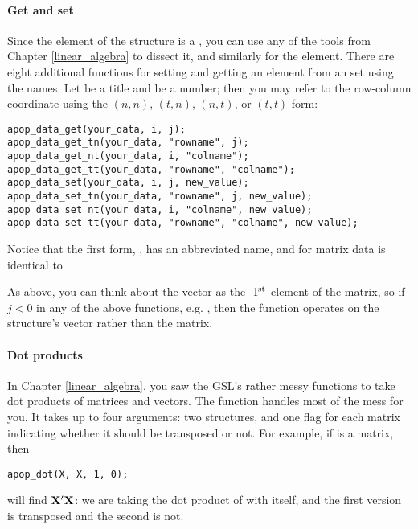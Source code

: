 \paragraph{Get and set} Since the  element of the  structure
is a , you can use any of the tools from Chapter
\ref{linear_algebra} to dissect it, and similarly for the
 element.
There are eight additional functions for setting and getting an element from an
 set using the names. Let  be a title and
 be a number; then you may refer to the row-column coordinate
using the $(n,n)$, $(t,n)$, $(n,t)$, or $(t,t)$ form:
\begin{lstlisting}
apop_data_get(your_data, i, j);
apop_data_get_tn(your_data, "rowname", j);
apop_data_get_nt(your_data, i, "colname");
apop_data_get_tt(your_data, "rowname", "colname");
apop_data_set(your_data, i, j, new_value);
apop_data_set_tn(your_data, "rowname", j, new_value);
apop_data_set_nt(your_data, i, "colname", new_value);
apop_data_set_tt(your_data, "rowname", "colname", new_value);
\end{lstlisting}
Notice that the first form, ,
has an abbreviated name, and for matrix data is identical to
. 

As above, you can think about the vector as the -1$^{\rm{st}}$ element
of the matrix, so if $j < 0$ in any of the above functions, e.g.
, then the
function operates on the  structure's vector rather
than the matrix.


\paragraph{Dot products} \label{apopdot} In Chapter \ref{linear_algebra}, you saw the
GSL's rather messy functions to take dot products of matrices and
vectors. The  function handles most of the mess for you.
It takes up to four arguments: two  structures, and one
flag for each matrix 
indicating whether it should be transposed or not. For example, if  is a matrix,
then 
\begin{lstlisting}
apop_dot(X, X, 1, 0);
\end{lstlisting}
will find ${\bf X}'{\bf X}$: we are taking the dot product of  with itself,
and the first version is transposed and the second is not.

